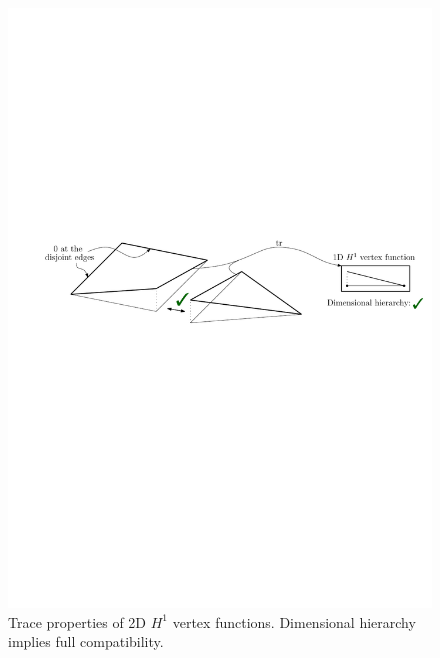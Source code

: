 \begin{figure}[!ht]
\begin{center}
\includegraphics[scale=0.7]{./figures/2DVertexFunctions.pdf}
\caption{Trace properties of 2D $H^1$ vertex functions. Dimensional hierarchy implies full compatibility.}
\label{fig:2Dvertexcompatibility}
\end{center}
\end{figure}

